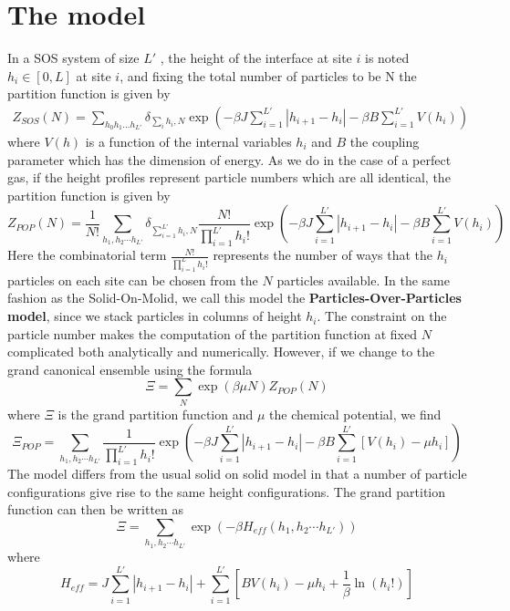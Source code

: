 \section{The model}

In a SOS system of size $L'$ , the height of the interface at site $i$ is noted $h_i \in [0,L]$ at site $i$, and fixing the total number of particles to be N the partition function is given by
\begin{align}
    Z_{SOS}(N) = \sum_{h_0 h_1 ... h_{L'}}  \delta_{\sum_i h_i, N}  \exp\left(-\beta J \sum_{i=1}^{L'} |h_{i+1}-h_i| -\beta B\sum_{i=1}^{L'} V(h_i)\right)
\end{align}
where $V(h)$ is a function of the internal variables $h_i$ and $B$ the coupling parameter which has the dimension of energy. As we do in the case of a perfect gas, if the height profiles represent particle numbers which are all identical, the partition function is given by
\begin{equation}
Z_{POP}(N) = \frac{1}{N!}\sum_{h_1,h_2\cdots h_{L'}} \delta_{\sum_{i=1}^{L'} h_i, N}\frac{N!}{\prod_{i=1}^{L'} h_i!} \exp\left(-\beta J \sum_{i=1}^{L'} |h_{i+1}-h_i| -\beta B \sum_{i=1}^{L'} V(h_i)\right)
\end{equation}
Here the combinatorial term $\frac{N!}{\prod_{i=1}^L h_i!}$ represents the number of ways that the $h_i$ particles on each site can be chosen from the $N$ particles available. In the same fashion as the Solid-On-Molid, we call this model the \textbf{Particles-Over-Particles model}, since we stack particles in columns of height $h_i$. The constraint on the particle number makes the computation of the partition function at fixed $N$ complicated both analytically and numerically. However, if we change to the grand canonical ensemble using
the formula
\begin{equation}
\Xi = \sum_{N} \exp(\beta\mu N) Z_{POP}(N)
\end{equation}
where $\Xi$ is the grand partition function and $\mu$ the chemical potential, we find
\begin{equation}
\Xi_{POP} = \sum_{h_1,h_2\cdots h_{L'}} \frac{1}{\prod_{i=1}^{L'} h_i!} \exp\left(-\beta J \sum_{i=1}^{L'} |h_{i+1}-h_i| -\beta B \sum_{i=1}^{L'}[ V(h_i)-\mu h_i]\right)
\end{equation}
The model differs from the usual solid on solid model in that a number of particle configurations give rise to the same height configurations. The grand partition function can then be written as 
\begin{equation}
\Xi = \sum_{h_1,h_2\cdots h_{L'}} \exp\left(-\beta H_{eff}(h_1,h_2\cdots h_{L'})\right)
\end{equation}
where 
\begin{equation}
    H_{eff}= J \sum_{i=1}^{L'} |h_{i+1}-h_i| +\sum_{i=1}^{L'} [B V(h_i)-\mu h_i +\frac{1}{\beta}\ln(h_i !)]
    \label{heff-pop}
\end{equation}

